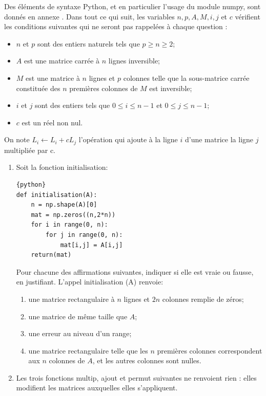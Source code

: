 \begin{exercice} 
Des éléments de syntaxe Python, et en particulier l'usage du module numpy, sont donnés en annexe . Dans tout ce qui suit, les variables $n, p, A, M, i, j$ et $c$ vérifient les conditions suivantes qui ne seront pas rappelées à chaque question :
\begin{itemize}


\item $n$ et $p$ sont des entiers naturels tels que $p \geq n \geq 2$;
\item $A$ est une matrice carrée à $n$ lignes inversible;
\item $M$ est une matrice à $n$ lignes et $p$ colonnes telle que la sous-matrice carrée constituée des $n$ premières colonnes de $M$ est inversible;
\item  $i$ et $j$ sont des entiers tels que $0 \leq i \leq n-1$ et $0 \leq j \leq n-1$;
\item  $c$ est un réel non nul.
\end{itemize}
On note $L_{i} \leftarrow L_{i}+c L_{j}$ l'opération qui ajoute à la ligne $i$ d'une matrice la ligne $j$ multipliée par c.
\begin{enumerate}


\item Soit la fonction initialisation:
\begin{lstlisting}{python}
def initialisation(A):
    n = np.shape(A)[0]
    mat = np.zeros((n,2*n))
    for i in range(0, n):
        for j in range(0, n):
            mat[i,j] = A[i,j]
    return(mat)
\end{lstlisting}
Pour chacune des affirmations suivantes, indiquer si elle est vraie ou fausse, en justifiant. L'appel initialisation (A) renvoie:
\begin{enumerate}


\item une matrice rectangulaire à $n$ lignes et $2 n$ colonnes remplie de zéros;
\item une matrice de même taille que $A$;
\item une erreur au niveau d'un range;
\item une matrice rectangulaire telle que les $n$ premières colonnes correspondent aux $n$ colonnes de $A$, et les autres colonnes sont nulles.\end{enumerate}
\item  Les trois fonctions multip, ajout et permut suivantes ne renvoient rien : elles modifient les matrices auxquelles elles s'appliquent.
\begin{enumerate}



\end{enumerate}
\end{enumerate}
\end{exercice}
